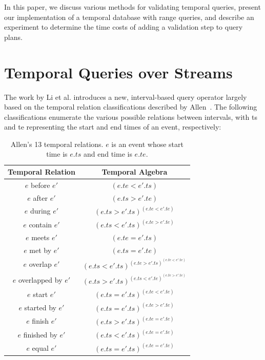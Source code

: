 \documentclass{achemso}
\begin{document}
In this paper, we discuss various methods for validating temporal queries, present our implementation of a temporal database with range queries, and describe an experiment to determine the time costs of adding a validation step to query plans.

\section{Temporal Queries over Streams}
The work by Li et al. introduces a new, interval-based query operator largely based on the temporal relation classifications described by Allen~\cite{Allen:1983}. The following classifications enumerate the various possible relations between intervals, with ts and te representing the start and end times of an event, respectively:

\begin{table}[!ht]\centering
\begin{tabular}{|c|c|}\hline
\textbf{Temporal Relation} & \textbf{Temporal Algebra}\\\hline
$e$ before $e'$ & $(e.te < e'.ts)$\\\hline
$e$ after $e'$ & $(e.ts > e'.te)$\\\hline
$e$ during $e'$ & $(e.ts > e'.ts) ^ (e.te < e'.te)$ \\\hline
$e$ contain $e'$ & $(e.ts < e'.ts) ^ (e.te > e'.te)$ \\\hline
$e$ meets $e'$ & $(e.te = e'.ts)$ \\\hline
$e$ met by $e'$ & $(e.ts = e'.te)$ \\\hline
$e$ overlap $e'$ & $(e.ts < e'.ts) ^ (e.te > e'.ts) ^ (e.te < e'.te)$ \\\hline
$e$ overlapped by $e'$ & $(e.ts > e'.ts) ^ (e.ts < e'.te) ^ (e.te > e'.te)$ \\\hline
$e$ start $e'$ & $(e.ts = e'.ts) ^ (e.te < e'.te)$ \\\hline
$e$ started by $e'$ & $(e.ts = e'.ts) ^ (e.te > e'.te)$ \\\hline
$e$ finish $e'$ & $(e.ts > e'.ts) ^ (e.te = e'.te)$ \\\hline
$e$ finished by $e'$ & $(e.ts < e'.ts) ^ (e.te = e'.te)$ \\\hline
$e$ equal $e'$ & $(e.ts = e'.ts) ^ (e.te = e'.te)$ \\\hline
\end{tabular}
\caption{Allen's 13 temporal relations. $e$ is an event whose start time is $e.ts$ and end time is $e.te$.}\label{tab:relations}
\end{table}
\end{document}
